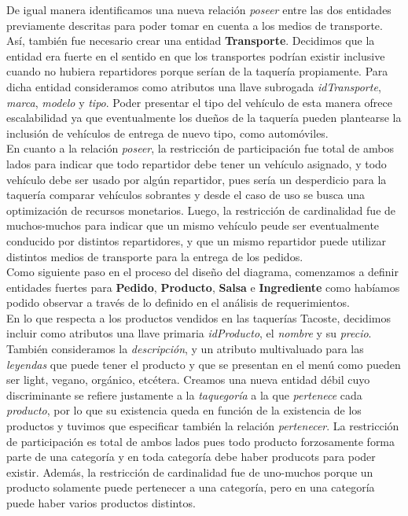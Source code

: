 \documentclass[11pt,letterpaper]{article}
\begin{document}
\newpage 
De igual manera identificamos una nueva relación \textit{poseer} entre las dos entidades previamente descritas para poder tomar en cuenta a los medios de transporte. Así, también fue necesario crear una entidad \textbf{Transporte}. Decidimos que la entidad era fuerte en el sentido en que los transportes podrían existir inclusive cuando no hubiera repartidores porque serían de la taquería propiamente. Para dicha entidad consideramos como atributos una llave subrogada \textit{idTransporte}, \textit{marca}, \textit{modelo} y \textit{tipo}. Poder presentar el tipo del vehículo de esta manera ofrece escalabilidad ya que eventualmente los dueños de la taquería pueden plantearse la inclusión de vehículos de entrega de nuevo tipo, como automóviles. \\

En cuanto a la relación \textit{poseer}, la restricción de participación fue total de ambos lados para indicar que todo repartidor debe tener un vehículo asignado, y todo vehículo debe ser usado por algún repartidor, pues sería un desperdicio para la taquería comparar vehículos sobrantes y desde el caso de uso se busca una optimización de recursos monetarios. Luego, la restricción de cardinalidad fue de muchos-muchos para indicar que un mismo vehículo peude ser eventualmente conducido por distintos repartidores, y que un mismo repartidor puede utilizar distintos medios de transporte para la entrega de los pedidos. \\

Como siguiente paso en el proceso del diseño del diagrama, comenzamos a definir entidades fuertes para \textbf{Pedido}, \textbf{Producto}, \textbf{Salsa} e  \textbf{Ingrediente} como habíamos podido observar a través de lo definido en el análisis de requerimientos. \\

En lo que respecta a los productos vendidos en las taquerías Tacoste, decidimos incluir como atributos una llave primaria \textit{idProducto}, el \textit{nombre} y su \textit{precio}. También consideramos la \textit{descripción}, y un atributo multivaluado para las \textit{leyendas} que puede tener el producto y que se presentan en el menú como pueden ser light, vegano, orgánico, etcétera. Creamos una nueva entidad débil cuyo discriminante se refiere justamente a la \textit{taquegoría} a la que \textit{pertenece} cada \textit{producto}, por lo que su existencia queda en función de la existencia de los productos y tuvimos que especificar también la relación \textit{pertenecer}. La restricción de participación es total de ambos lados pues todo producto forzosamente forma parte de una categoría y en toda categoría debe haber producots para poder existir. Además, la restricción de cardinalidad fue de uno-muchos porque un producto solamente puede pertenecer a una categoría, pero en una categoría puede haber varios productos distintos. \\
\end{document}
